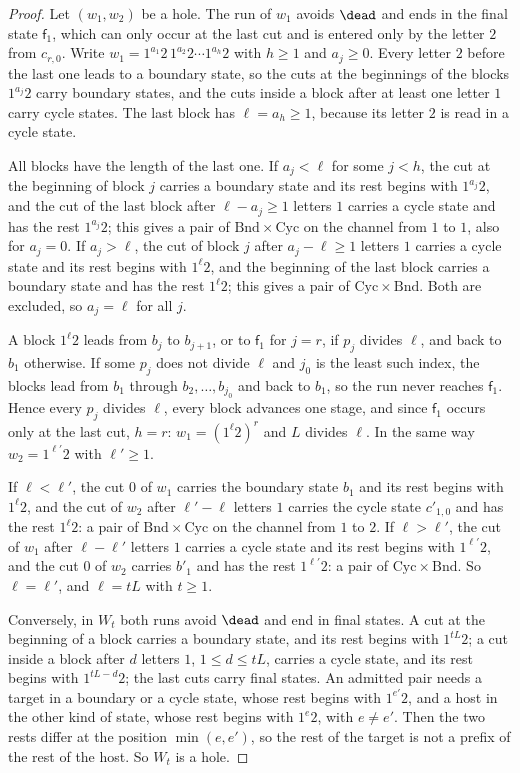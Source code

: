 \begin{proof}
Let $(w_1,w_2)$ be a hole. The run of $w_1$ avoids $\dead$ and ends in the
final state $\mathsf f_1$, which can only occur at the last cut and is entered only
by the letter $2$ from $c_{r,0}$. Write $w_1=1^{a_1}2\,1^{a_2}2\cdots
1^{a_h}2$ with $h\ge1$ and $a_j\ge0$. Every letter $2$ before the last one
leads to a boundary state, so the cuts at the beginnings of the blocks
$1^{a_j}2$ carry boundary states, and the cuts inside a block after at
least one letter $1$ carry cycle states. The last block has $\ell=a_h\ge1$,
because its letter $2$ is read in a cycle state.

All blocks have the length of the last one. If $a_j<\ell$ for some $j<h$,
the cut at the beginning of block $j$ carries a boundary state and its rest
begins with $1^{a_j}2$, and the cut of the last block after $\ell-a_j\ge1$
letters $1$ carries a cycle state and has the rest $1^{a_j}2$; this gives a
pair of $\mathrm{Bnd}\times\mathrm{Cyc}$ on the channel from $1$ to $1$, also
for $a_j=0$. If $a_j>\ell$, the cut of block $j$ after $a_j-\ell\ge1$
letters $1$ carries a cycle state and its rest begins with $1^\ell2$, and the
beginning of the last block carries a boundary state and has the rest
$1^\ell2$; this gives a pair of $\mathrm{Cyc}\times\mathrm{Bnd}$. Both are
excluded, so $a_j=\ell$ for all $j$.

A block $1^\ell2$ leads from $b_j$ to $b_{j+1}$, or to $\mathsf f_1$ for $j=r$, if
$p_j$ divides $\ell$, and back to $b_1$ otherwise. If some $p_j$ does not
divide $\ell$ and $j_0$ is the least such index, the blocks lead from $b_1$
through $b_2,\dots,b_{j_0}$ and back to $b_1$, so the run never reaches
$\mathsf f_1$. Hence every $p_j$ divides $\ell$, every block advances one stage, and
since $\mathsf f_1$ occurs only at the last cut, $h=r$: $w_1=(1^\ell2)^r$ and $L$
divides $\ell$. In the same way $w_2=1^{\ell'}2$ with $\ell'\ge1$.

If $\ell<\ell'$, the cut $0$ of $w_1$ carries the boundary state $b_1$ and
its rest begins with $1^\ell2$, and the cut of $w_2$ after $\ell'-\ell$
letters $1$ carries the cycle state $c'_{1,0}$ and has the rest $1^\ell2$:
a pair of $\mathrm{Bnd}\times\mathrm{Cyc}$ on the channel from $1$ to $2$. If
$\ell>\ell'$, the cut of $w_1$ after $\ell-\ell'$ letters $1$ carries a cycle
state and its rest begins with $1^{\ell'}2$, and the cut $0$ of $w_2$
carries $b'_1$ and has the rest $1^{\ell'}2$: a pair of
$\mathrm{Cyc}\times\mathrm{Bnd}$. So $\ell=\ell'$, and $\ell=tL$ with $t\ge1$.

Conversely, in $W_t$ both runs avoid $\dead$ and end in final states. A cut
at the beginning of a block carries a boundary state, and its rest begins
with $1^{tL}2$; a cut inside a block after $d$ letters $1$, $1\le d\le tL$,
carries a cycle state, and its rest begins with $1^{tL-d}2$; the last cuts
carry final states. An admitted pair needs a target in a boundary or a cycle
state, whose rest begins with $1^{e'}2$, and a host in the other kind of
state, whose rest begins with $1^e2$, with $e\ne e'$. Then the two rests
differ at the position $\min(e,e')$, so the rest of the target is not a
prefix of the rest of the host. So $W_t$ is a hole.
\end{proof}

